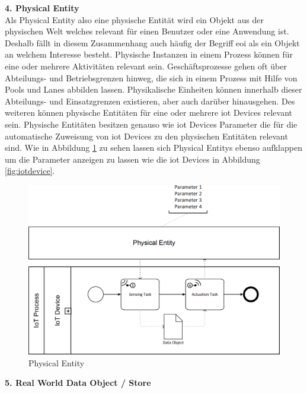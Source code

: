 \documentclass[a4paper, 12pt, twoside, headsepline=true]{scrartcl} %
\begin{document}
\textbf{4. Physical Entity}\\

Als Physical Entity also eine physische Entität wird ein Objekt aus der physischen Welt welches relevant für einen Benutzer oder eine Anwendung ist. Deshalb fällt in diesem Zusammenhang auch häufig der Begriff \acl{eoi} als ein Objekt an welchem Interesse besteht. Physische Instanzen in einem Prozess können für eine oder mehrere Aktivitäten relevant sein. Geschäftsprozesse gehen oft über Abteilungs- und Betriebsgrenzen hinweg, die sich in einem Prozess mit Hilfe von Pools und Lanes abbilden lassen. Physikalische Einheiten können innerhalb dieser Abteilungs- und Einsatzgrenzen existieren, aber auch darüber hinausgehen. Des weiteren können physische Entitäten für eine oder mehrere \ac{iot} Devices relevant sein\cite[S.58-59]{conceptsiotawarepm}. Physische Entitäten besitzen genauso wie \ac{iot} Devices Parameter die für die automatische Zuweisung von \ac{iot} Devices zu den physischen Entitäten relevant sind. Wie in Abbildung \ref{fig:physicalentity} zu sehen lassen sich Physical Entitys ebenso aufklappen um die Parameter anzeigen zu lassen wie die \ac{iot} Devices in Abbildung \ref{fig:iotdevice}. 

\begin{figure}[H]
	\includegraphics[height=7.3 cm,keepaspectratio,center]{figures/PhysicalEntity}
	\caption{Physical Entity \cite[S.62]{conceptsiotawarepm}}
	\label{fig:physicalentity}
\end{figure} 

\textbf{5. Real World Data Object / Store}\\
\end{document}
